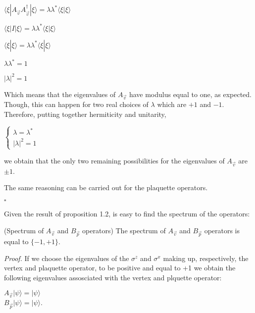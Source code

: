 \documentclass{Configuration_Files/PoliMi3i_thesis}
\begin{document}
\begin{center}
	$\langle \xi|A_{\vec{v}} A_{\vec{v}}^{\dagger}|\xi\rangle = \lambda \lambda^* \langle \xi |\xi \rangle$
	
	$\langle \xi|I|\xi \rangle = \lambda \lambda^* \langle \xi |\xi \rangle$
	
	$\langle \xi|\xi \rangle = \lambda \lambda^* \langle \xi |\xi \rangle $
	
	$ \lambda \lambda^* = 1 $
	
	$ |\lambda|^2 = 1 $
\end{center}

Which means that the eigenvalues of $A_{\vec{v}}$ have modulus equal to one, as expected. Though, this can happen for two real choices of $\lambda$ which are $+1$ and $-1$.
Therefore, putting together hermiticity and unitarity, 

\begin{center}
$\begin{cases}
	 \lambda = \lambda^* \\
	 |\lambda|^2 = 1 
\end{cases}$
\end{center}

we obtain that the only two remaining possibilities for the eigenvalues of $A_{\vec{v}}$ are $\pm 1$. \newline

The same reasoning can be carried out for the plaquette operators.

\hfill $\square$ 

Given the result of proposition 1.2, is easy to find the spectrum of the operators: 

\begin{proposition} (Spectrum of $A_{\vec{v}}$ and $B_{\vec{p}}$ operators) The spectrum of $A_{\vec{v}}$ and $B_{\vec{p}}$ operators is equal to $\{-1,+1\}$. 
\end{proposition}

\textit{Proof.}\newline
If we choose the eigenvalues of the $\sigma^z$ and $\sigma^x$ making up, respectively, the vertex and plaquette operator, to be positive and equal to +1 we obtain the following eigenvalues assosciated with the vertex and plquette operator:

\begin{center}
	$A_{\vec{v}} |\psi\rangle = |\psi\rangle$ \\
	$B_{\vec{p}} |\psi\rangle = |\psi\rangle$.
\end{center}
\end{document}
